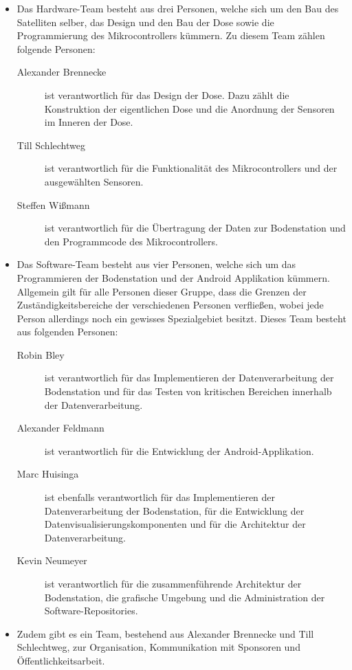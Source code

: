 \begin{itemize}
\item Das Hardware-Team besteht aus drei Personen, welche sich um den Bau des Satelliten selber, das Design und den Bau der Dose sowie die Programmierung des Mikrocontrollers kümmern. Zu diesem Team zählen folgende Personen:
\begin {description}
\item [Alexander Brennecke] ist verantwortlich für das Design der Dose. Dazu zählt die Konstruktion der eigentlichen Dose und die Anordnung der Sensoren im Inneren der Dose.

\item [Till Schlechtweg] ist verantwortlich für die Funktionalität des Mikrocontrollers und der ausgewählten Sensoren.

\item [Steffen Wißmann] ist verantwortlich für die Übertragung der Daten zur Bodenstation und den Programmcode des Mikrocontrollers.
\end {description}
\item Das Software-Team besteht aus vier Personen, welche sich um das Programmieren der Bodenstation und der Android Applikation kümmern. Allgemein gilt für alle Personen dieser Gruppe, dass die Grenzen der Zuständigkeitsbereiche der verschiedenen Personen verfließen, wobei jede Person allerdings noch ein gewisses Spezialgebiet besitzt. Dieses Team besteht aus folgenden Personen:
\begin {description}
\item [Robin Bley] ist verantwortlich für das Implementieren der Datenverarbeitung der Bodenstation und für das Testen von kritischen Bereichen innerhalb der Datenverarbeitung.

\item [Alexander Feldmann] ist verantwortlich für die Entwicklung der Android-Applikation.

\item [Marc Huisinga] ist ebenfalls verantwortlich für das Implementieren der Datenverarbeitung der Bodenstation, für die Entwicklung der Datenvisualisierungskomponenten und für die Architektur der Datenverarbeitung.

\item [Kevin Neumeyer] ist verantwortlich für die zusammenführende Architektur der Bodenstation, die grafische Umgebung und die Administration der Software-Repositories.
\end {description}
\item Zudem gibt es ein Team, bestehend aus Alexander Brennecke und Till Schlechtweg, zur Organisation, Kommunikation mit Sponsoren und Öffentlichkeitsarbeit.


\end{itemize}
